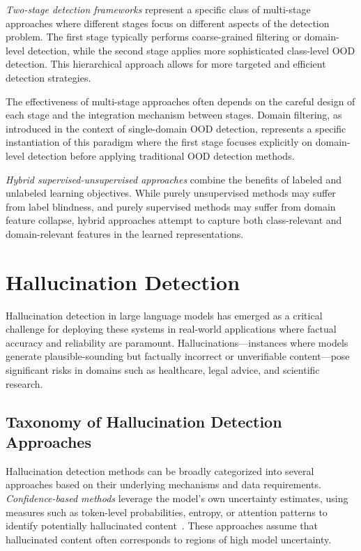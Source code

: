 \documentclass[11pt, oneside]{book}
\theoremstyle{plain}
\theoremstyle{definition}
\theoremstyle{remark}
\begin{document}
\emph{Two-stage detection frameworks} represent a specific class of multi-stage approaches where different stages focus on different aspects of the detection problem. The first stage typically performs coarse-grained filtering or domain-level detection, while the second stage applies more sophisticated class-level OOD detection. This hierarchical approach allows for more targeted and efficient detection strategies.

The effectiveness of multi-stage approaches often depends on the careful design of each stage and the integration mechanism between stages. Domain filtering, as introduced in the context of single-domain OOD detection, represents a specific instantiation of this paradigm where the first stage focuses explicitly on domain-level detection before applying traditional OOD detection methods.

\emph{Hybrid supervised-unsupervised approaches} combine the benefits of labeled and unlabeled learning objectives. While purely unsupervised methods may suffer from label blindness, and purely supervised methods may suffer from domain feature collapse, hybrid approaches attempt to capture both class-relevant and domain-relevant features in the learned representations.

\section{Hallucination Detection}

Hallucination detection in large language models has emerged as a critical challenge for deploying these systems in real-world applications where factual accuracy and reliability are paramount. Hallucinations—instances where models generate plausible-sounding but factually incorrect or unverifiable content—pose significant risks in domains such as healthcare, legal advice, and scientific research.

\subsection{Taxonomy of Hallucination Detection Approaches}

Hallucination detection methods can be broadly categorized into several approaches based on their underlying mechanisms and data requirements. \emph{Confidence-based methods} leverage the model's own uncertainty estimates, using measures such as token-level probabilities, entropy, or attention patterns to identify potentially hallucinated content~\citep{manakul2023selfcheckgpt,zhang2023sirens}. These approaches assume that hallucinated content often corresponds to regions of high model uncertainty.
\end{document}
